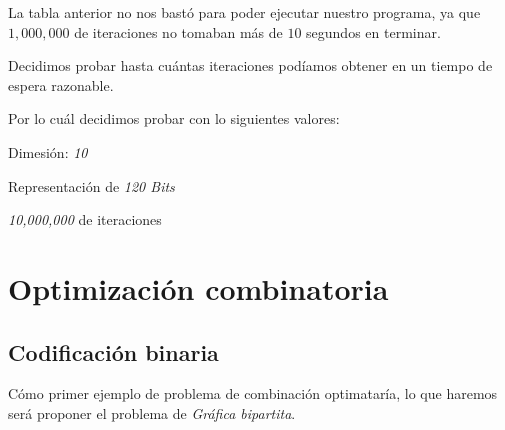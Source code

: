 \documentclass{article}
\begin{document}
La tabla anterior no nos bastó para poder ejecutar nuestro programa, ya que $1,000,000$ de iteraciones no tomaban más de $10$ segundos en terminar.

Decidimos probar hasta cuántas iteraciones podíamos obtener en un tiempo de espera razonable.

Por lo cuál decidimos probar con lo siguientes valores:

Dimesión: \textit{10}

Representación de \textit{120 Bits}

\textit{10,000,000} de iteraciones

\begin{table}[h]
\caption{Representación 120 bits y $10,000,000$ de iteraciones}
\end{table}


\newpage
\section*{Optimización combinatoria}

\subsection*{Codificación binaria}
Cómo primer ejemplo de problema de combinación optimataría, lo que 
haremos será proponer el problema de \textit{Gráfica bipartita}.
\end{document}
